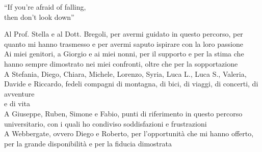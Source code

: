 \begingroup
  \let\clearpage\endgroup
  \null{}
  \begin{minipage}{5.3in}
  
    \begin{flushright}
      \begin{em}
        ``If you're afraid of falling,\\then don't look down''
      \end{em}

      \vspace{4cm}

      \begin{em}
        Al Prof. Stella e al Dott. Bregoli, per avermi guidato in questo percorso, per quanto mi hanno trasmesso e 
        per avermi saputo ispirare con la loro passione\\[10pt]
        Ai miei genitori, a Giorgio e ai miei nonni, per il supporto e per la stima che hanno sempre dimostrato nei miei confronti,
        oltre che per la sopportazione\\[10pt]
        A Stefania, Diego, Chiara, Michele, Lorenzo, Syria, Luca L., Luca S., Valeria, Davide e Riccardo, fedeli compagni di montagna, di bici,
        di viaggi, di concerti, di avventure\\e di vita\\[10pt]
        A Giuseppe, Ruben, Simone e Fabio, punti di riferimento in questo percorso universitario,
        con i quali ho condiviso soddisfazioni e frustrazioni\\[10pt]
        A Webbergate, ovvero Diego e Roberto, per l'opportunità che mi hanno offerto, per la grande disponibilità e per 
        la fiducia dimostrata
      \end{em}
    \end{flushright}
  \end{minipage}
   \null
\endgroup